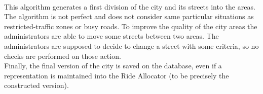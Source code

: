 \documentclass[\mainpath/main]{subfiles}
\begin{document}
\\[0.5cm]
	
This algorithm generates a first division of the city and its streets into the areas. The algorithm is not perfect and does not consider same particular situations as restricted-traffic zones or busy roads. To improve the quality of the city areas the administrators are able to move some streets between two areas. The administrators are supposed to decide to change a street with some criteria, so no checks are performed on those action.\\
Finally, the final version of the city is saved on the database, even if a representation is maintained into the Ride Allocator (to be precisely the constructed version). 
\end{document}
